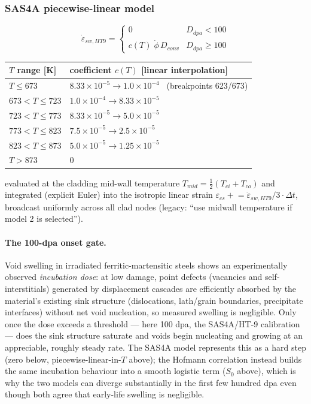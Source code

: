 \begin{refsection}
\subsubsection{SAS4A piecewise-linear model}

\begin{equation}
  \dot\varepsilon_{sw,HT9} = \begin{cases}
    0 & D_{dpa} < 100 \\[4pt]
    c(T)\;\dot\phi\,D_{conv} & D_{dpa} \geq 100
  \end{cases}
  \label{eq:sas_swelling}
\end{equation}

\begin{center}
\begin{tabular}{ll}
\toprule
$T$ range [K] & coefficient $c(T)$ [linear interpolation] \\
\midrule
$T \leq 673$        & $8.33\times10^{-5} \to 1.0\times10^{-4}$ \ (breakpoints 623/673) \\
$673 < T \leq 723$  & $1.0\times10^{-4} \to 8.33\times10^{-5}$ \\
$723 < T \leq 773$  & $8.33\times10^{-5} \to 5.0\times10^{-5}$ \\
$773 < T \leq 823$  & $7.5\times10^{-5} \to 2.5\times10^{-5}$ \\
$823 < T \leq 873$  & $5.0\times10^{-5} \to 1.25\times10^{-5}$ \\
$T > 873$           & $0$ \\
\bottomrule
\end{tabular}
\end{center}

evaluated at the cladding mid-wall temperature
$T_{mid} = \tfrac12(T_{ci} + T_{co})$ and integrated (explicit Euler) into
the isotropic linear strain
$\varepsilon_{cs} \mathrel{+}= \dot\varepsilon_{sw,HT9}/3 \cdot \Delta t$,
broadcast uniformly across all clad nodes (legacy: ``use midwall
temperature if model 2 is selected'').

\paragraph{The 100-dpa onset gate.} Void swelling in irradiated
ferritic-martensitic steels shows an experimentally observed
\emph{incubation dose}: at low damage, point defects (vacancies and
self-interstitials) generated by displacement cascades are efficiently
absorbed by the material's existing sink structure (dislocations,
lath/grain boundaries, precipitate interfaces) without net void
nucleation, so measured swelling is negligible.  Only once the dose
exceeds a threshold --- here 100 dpa, the SAS4A/HT-9 calibration --- does
the sink structure saturate and voids begin nucleating and growing at an
appreciable, roughly steady rate.  The SAS4A model represents this as a
hard step (zero below, piecewise-linear-in-$T$ above); the Hofmann
correlation instead builds the same incubation behaviour into a smooth
logistic term ($S_0$ above), which is why the two models can diverge
substantially in the first few hundred dpa even though both agree that
early-life swelling is negligible.


\end{refsection}
